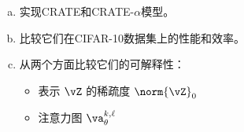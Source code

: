 \documentclass[../../book-main_zh.tex]{subfiles}
\begin{document}
\begin{exercise}
\phantom{}
\begin{enumerate}[(a)]
\item 实现CRATE和CRATE-\(\alpha\)模型。
\item 比较它们在CIFAR-10数据集上的性能和效率。
\item 从两个方面比较它们的可解释性：
    \begin{itemize}
        \item 表示 \(\vZ\) 的稀疏度 \(\norm{\vZ}_{0}\)
        \item 注意力图 \(\va_{\theta}^{k, \ell}\)
    \end{itemize}
\end{enumerate}
\end{exercise}
\end{document}
